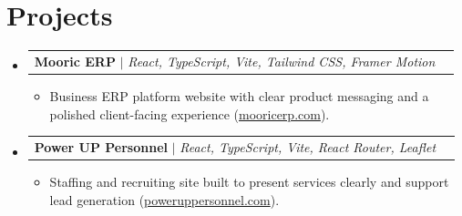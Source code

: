 \documentclass[letterpaper,11pt]{article}
\makeatletter
\newcommand{\resumeItem}[1]{
  \item\small{
    {#1 \vspace{-2pt}}
  }
}
\newcommand{\resumeProjectHeading}[2]{
    \item
    \begin{tabular*}{0.97\textwidth}{l@{\extracolsep{\fill}}r}
      \small#1 & #2 \\
    \end{tabular*}\vspace{-7pt}
}
\newcommand{\resumeSubHeadingListStart}{\begin{itemize}[leftmargin=0.15in, label={}]}
\newcommand{\resumeSubHeadingListEnd}{\end{itemize}}
\newcommand{\resumeItemListStart}{\begin{itemize}}
\newcommand{\resumeItemListEnd}{\end{itemize}\vspace{-5pt}}
\makeatother
\begin{document}
\section{Projects}
  \resumeSubHeadingListStart
    \resumeProjectHeading
      {\textbf{Mooric ERP} $|$ \emph{React, TypeScript, Vite, Tailwind CSS, Framer Motion}}{}
      \resumeItemListStart
        \resumeItem{Business ERP platform website with clear product messaging and a polished client-facing experience (\href{https://mooricerp.com}{mooricerp.com}).}
      \resumeItemListEnd
    \resumeProjectHeading
      {\textbf{Power UP Personnel} $|$ \emph{React, TypeScript, Vite, React Router, Leaflet}}{}
      \resumeItemListStart
        \resumeItem{Staffing and recruiting site built to present services clearly and support lead generation (\href{https://poweruppersonnel.com}{poweruppersonnel.com}).}
      \resumeItemListEnd
  \resumeSubHeadingListEnd
\end{document}
